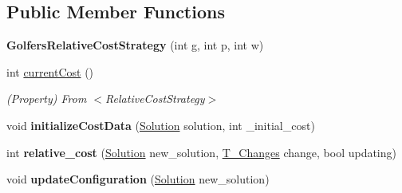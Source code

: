 \subsection*{Public Member Functions}
\begin{DoxyCompactItemize}
\item 
\mbox{\label{classPOSL_1_1Benchmarks_1_1GolfersRelativeCostStrategy_a04e66ae4875f31dd4cf3cc7bb9c6628e}} 
{\bfseries Golfers\+Relative\+Cost\+Strategy} (int g, int p, int w)
\item 
\mbox{\label{classPOSL_1_1Benchmarks_1_1GolfersRelativeCostStrategy_a8ca6815af453ac3bdac994568b1271aa}} 
int \hyperlink{classPOSL_1_1Benchmarks_1_1GolfersRelativeCostStrategy_a8ca6815af453ac3bdac994568b1271aa}{current\+Cost} ()
\begin{DoxyCompactList}\small\item\em (Property) From $<$\+Relative\+Cost\+Strategy$>$ \end{DoxyCompactList}\item 
\mbox{\label{classPOSL_1_1Benchmarks_1_1GolfersRelativeCostStrategy_a4cd8227c9b4cc4f3cc60025c0edc7f9f}} 
void {\bfseries initialize\+Cost\+Data} (\hyperlink{classPOSL_1_1Data_1_1Solution}{Solution} solution, int \+\_\+initial\+\_\+cost)
\item 
\mbox{\label{classPOSL_1_1Benchmarks_1_1GolfersRelativeCostStrategy_a11c9ae1e6798fd68965e2dfdc577e76b}} 
int {\bfseries relative\+\_\+cost} (\hyperlink{classPOSL_1_1Data_1_1Solution}{Solution} new\+\_\+solution, \hyperlink{structPOSL_1_1Tools_1_1T__Changes}{T\+\_\+\+Changes} change, bool updating)
\item 
\mbox{\label{classPOSL_1_1Benchmarks_1_1GolfersRelativeCostStrategy_ab194469d5bd6f4a8139ae5794690515a}} 
void {\bfseries update\+Configuration} (\hyperlink{classPOSL_1_1Data_1_1Solution}{Solution} new\+\_\+solution)
\item 
\mbox{\label{classPOSL_1_1Benchmarks_1_1GolfersRelativeCostStrategy_afdb9cae8e34b3e99fab4ec3b7e01e7df}} 

\end{DoxyCompactItemize}
